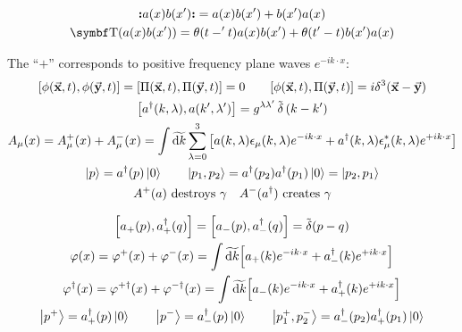 \begin{gather*}
        \nord{a(x)b(x')} = a(x)b(x') + b(x')a(x)
        \\
        \Tordp(a(x)b(x')) = \theta(t-'t)a(x)b(x') + \theta(t'-t)b(x')a(x)
\end{gather*}

The ``$+$'' corresponds to positive frequency plane waves $e^{-ik\cdot x}$:
\begin{gather*}
        \comm{\phi(\va{x},t)}{\phi(\va{y},t)} = \comm{\Pi(\va{x},t)}{\Pi(\va{y},t)} = 0
        \qquad
        \comm{\phi(\va{x},t)}{\Pi(\va{y},t)} = i\delta^3\qty(\va{x}-\va{y})
        \\
        \comm{a^\dagger\qty(k,\lambda)}{a\qty(k',\lambda')}
        = g^{\lambda\lambda'}\Tdelta\qty(k-k')
        \\
        A_\mu(x)
        = A_\mu^+(x) + A_\mu^-(x)
        = \int\Tdd{k}\sum_{\lambda=0}^3 \qty[a(k,\lambda)\epsilon_\mu(k,\lambda)e^{-ik\cdot x} + a^\dagger(k,\lambda)\epsilon_\mu^*(k,\lambda)e^{+ik\cdot x}]
        \\
        \ket{p} = a^\dagger(p)\ket{0}
        \qquad
        \ket{p_1,p_2} = a^\dagger(p_2)a^\dagger(p_1)\ket{0} = \ket{p_2,p_1}
        \\
        A^+(a) \text{ destroys } \ce{\gamma}
        \quad
        A^-(a^\dagger) \text{ creates } \ce{\gamma}
\end{gather*}

\begin{gather*}
        \comm{a_+(p)}{a_+^\dagger(q)}
        = \comm{a_-(p)}{a_-^\dagger(q)}
        = \Tdelta(p-q)
        \\
        \varphi(x)
        = \varphi^+(x) + \varphi^-(x)
        = \int\Tdd{k} \qty[a_+(k)e^{-ik\cdot x} + a_-^\dagger(k)e^{+ik\cdot x}]
        \\
        \varphi^\dagger(x)
        = \varphi^{+\dagger}(x) + \varphi^{-\dagger}(x)
        = \int\Tdd{k} \qty[a_-(k)e^{-ik\cdot x} + a_+^\dagger(k)e^{+ik\cdot x}]
        \\
        \ket{p^+} = a_+^\dagger(p)\ket{0}
        \qquad
        \ket{p^-} = a_-^\dagger(p)\ket{0}
        \qquad
        \ket{p_1^+,p_2^-} = a_-^\dagger(p_2)a_+^\dagger(p_1)\ket{0}
\end{gather*}
